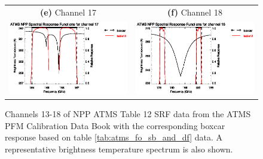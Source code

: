 \begin{figure}[H]
\begin{tabular}{c c}
    \textsf{\textbf{(e)} Channel 17} &
    \textsf{\textbf{(f)} Channel 18} \\
    \includegraphics[bb=70 400 300 559,clip,scale=1.0]{graphics/srf/table12/atms_npp.ch17.osrf.eps} &
    \includegraphics[bb=70 400 300 559,clip,scale=1.0]{graphics/srf/table12/atms_npp.ch18.osrf.eps}
  \end{tabular}
  \caption{Channels 13-18 of NPP ATMS Table 12 SRF data from the ATMS PFM Calibration Data Book\cite{ATMS_PFM_CalLog} with the corresponding boxcar response based on table \ref{tab:atms_fo_sb_and_df} data. A representative brightness temperature spectrum is also shown.}
  \label{fig:atms_npp.table12.ch13-18.osrf}
\end{figure}

